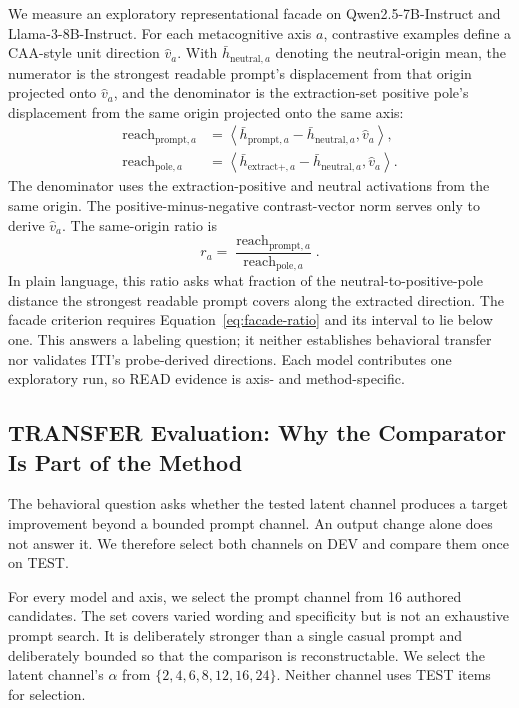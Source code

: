 \documentclass[sigconf]{acmart}
\begin{document}
We measure an exploratory representational facade on Qwen2.5-7B-Instruct and Llama-3-8B-Instruct. For each metacognitive axis \(a\), contrastive examples define a CAA-style unit direction \(\hat v_a\). With \(\bar h_{\mathrm{neutral},a}\) denoting the neutral-origin mean, the numerator is the strongest readable prompt's displacement from that origin projected onto \(\hat v_a\), and the denominator is the extraction-set positive pole's displacement from the same origin projected onto the same axis:
\begin{align}
  \operatorname{reach}_{\mathrm{prompt},a}
    &= \left\langle
       \bar h_{\mathrm{prompt},a}-\bar h_{\mathrm{neutral},a},
       \hat v_a
       \right\rangle, \nonumber\\
  \operatorname{reach}_{\mathrm{pole},a}
    &= \left\langle
       \bar h_{\mathrm{extract}+,a}-\bar h_{\mathrm{neutral},a},
       \hat v_a
       \right\rangle.
  \label{eq:facade-reaches}
\end{align}
The denominator uses the extraction-positive and neutral activations from the same origin. The positive-minus-negative contrast-vector norm serves only to derive \(\hat v_a\). The same-origin ratio is
\begin{equation}
  r_a =
  \frac{\operatorname{reach}_{\mathrm{prompt},a}}
       {\operatorname{reach}_{\mathrm{pole},a}}.
  \label{eq:facade-ratio}
\end{equation}
In plain language, this ratio asks what fraction of the neutral-to-positive-pole distance the strongest readable prompt covers along the extracted direction.
The facade criterion requires Equation~\ref{eq:facade-ratio} and its interval to lie below one. This answers a labeling question; it neither establishes behavioral transfer nor validates ITI's probe-derived directions. Each model contributes one exploratory run, so READ evidence is axis- and method-specific.

\subsection{TRANSFER Evaluation: Why the Comparator Is Part of the Method}

The behavioral question asks whether the tested latent channel produces a target improvement beyond a bounded prompt channel. An output change alone does not answer it. We therefore select both channels on DEV and compare them once on TEST.

For every model and axis, we select the prompt channel from 16 authored candidates. The set covers varied wording and specificity but is not an exhaustive prompt search. It is deliberately stronger than a single casual prompt and deliberately bounded so that the comparison is reconstructable. We select the latent channel's \(\alpha\) from \(\{2,4,6,8,12,16,24\}\). Neither channel uses TEST items for selection.
\end{document}
